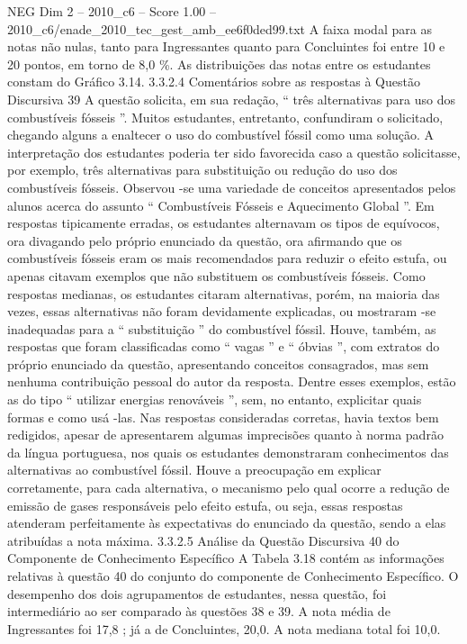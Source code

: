 \begin{textsample}{NEG Dim 2 – 2010\_c6 – Score 1.00 – 2010\_c6/enade\_2010\_tec\_gest\_amb\_ee6f0ded99.txt}
A faixa modal para as notas não nulas, tanto para Ingressantes quanto para Concluintes foi entre 10 e 20 pontos, em torno de 8,0 \%.
As distribuições das notas entre os estudantes constam do Gráfico 3.14. 3.3.2.4 Comentários sobre as respostas à Questão Discursiva 39 A questão solicita, em sua redação, “ três alternativas para uso dos combustíveis fósseis ”.
Muitos estudantes, entretanto, confundiram o solicitado, chegando alguns a enaltecer o uso do combustível fóssil como uma solução.
A interpretação dos estudantes poderia ter sido favorecida caso a questão solicitasse, por exemplo, três alternativas para substituição ou redução do uso dos combustíveis fósseis.
Observou -se uma variedade de conceitos apresentados pelos alunos acerca do assunto “ Combustíveis Fósseis e Aquecimento Global ”.
Em respostas tipicamente erradas, os estudantes alternavam os tipos de equívocos, ora divagando pelo próprio enunciado da questão, ora afirmando que os combustíveis fósseis eram os mais recomendados para reduzir o efeito estufa, ou apenas citavam exemplos que não substituem os combustíveis fósseis.
Como respostas medianas, os estudantes citaram alternativas, porém, na maioria das vezes, essas alternativas não foram devidamente explicadas, ou mostraram -se inadequadas para a “ substituição ” do combustível fóssil.
Houve, também, as respostas que foram classificadas como “ vagas ” e “ óbvias ”, com extratos do próprio enunciado da questão, apresentando conceitos consagrados, mas sem nenhuma contribuição pessoal do autor da resposta.
Dentre esses exemplos, estão as do tipo “ utilizar energias renováveis ”, sem, no entanto, explicitar quais formas e como usá -las.
Nas respostas consideradas corretas, havia textos bem redigidos, apesar de apresentarem algumas imprecisões quanto à norma padrão da língua portuguesa, nos quais os estudantes demonstraram conhecimentos das alternativas ao combustível fóssil.
Houve a preocupação em explicar corretamente, para cada alternativa, o mecanismo pelo qual ocorre a redução de emissão de gases responsáveis pelo efeito estufa, ou seja, essas respostas atenderam perfeitamente às expectativas do enunciado da questão, sendo a elas atribuídas a nota máxima. 3.3.2.5 Análise da Questão Discursiva 40 do Componente de Conhecimento Específico A Tabela 3.18 contém as informações relativas à questão 40 do conjunto do componente de Conhecimento Específico.
O desempenho dos dois agrupamentos de estudantes, nessa questão, foi intermediário ao ser comparado às questões 38 e 39.
A nota média de Ingressantes foi 17,8 ; já a de Concluintes, 20,0.
A nota mediana total foi 10,0.

\end{textsample}
